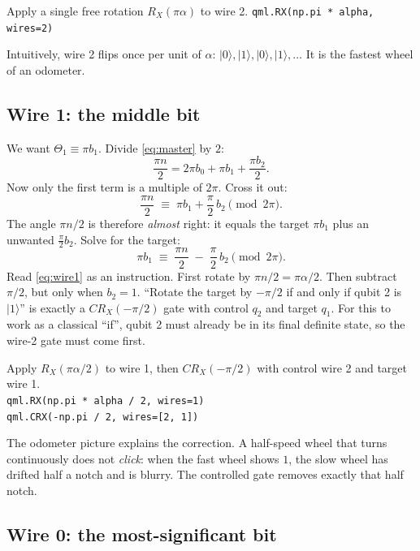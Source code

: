 \documentclass[11pt,a4paper]{article}
\newcommand{\ket}[1]{\lvert #1 \rangle}
\newcommand{\RX}{R_X}
\newcommand{\CRX}{CR_X}
\newcommand{\code}[1]{\texttt{#1}}
\newcommand{\eqmod}[1]{\;\equiv\;#1\pmod{2\pi}}
\theoremstyle{plain}
\theoremstyle{definition}
\theoremstyle{remark}
\begin{document}
\begin{resultbox}
Apply a single free rotation $\RX(\pi\alpha)$ to wire 2. \hfill \code{qml.RX(np.pi * alpha, wires=2)}
\end{resultbox}

\noindent Intuitively, wire 2 flips once per unit of $\alpha$: $\ket{0},\ket{1},\ket{0},\ket{1},\dots$
It is the fastest wheel of an odometer.

\subsection{Wire 1: the middle bit}

We want $\Theta_1 \equiv \pi b_1$. Divide \eqref{eq:master} by $2$:
\[
\frac{\pi n}{2} = 2\pi b_0 + \pi b_1 + \frac{\pi b_2}{2}.
\]
Now only the first term is a multiple of $2\pi$. Cross it out:
\[
\frac{\pi n}{2} \eqmod{\pi b_1 + \frac{\pi}{2}\,b_2}.
\]
The angle $\pi n/2$ is therefore \emph{almost} right: it equals the target $\pi b_1$ plus an
unwanted $\frac{\pi}{2}b_2$. Solve for the target:
\begin{equation}\label{eq:wire1}
\pi b_1 \eqmod{\frac{\pi n}{2} \;-\; \frac{\pi}{2}\,b_2}.
\end{equation}
Read \eqref{eq:wire1} as an instruction. First rotate by $\pi n/2 = \pi\alpha/2$. Then subtract
$\pi/2$, but only when $b_2 = 1$. ``Rotate the target by $-\pi/2$ if and only if qubit 2 is
$\ket{1}$'' is exactly a $\CRX(-\pi/2)$ gate with control $q_2$ and target $q_1$. For this to work
as a classical ``if'', qubit 2 must already be in its final definite state, so the wire-2 gate
must come first.

\begin{resultbox}
Apply $\RX(\pi\alpha/2)$ to wire 1, then $\CRX(-\pi/2)$ with control wire 2 and target wire 1.\\[3pt]
\code{qml.RX(np.pi * alpha / 2, wires=1)}\\
\code{qml.CRX(-np.pi / 2, wires=[2, 1])}
\end{resultbox}

\noindent The odometer picture explains the correction. A half-speed wheel that turns
continuously does not \emph{click}: when the fast wheel shows $1$, the slow wheel has drifted half
a notch and is blurry. The controlled gate removes exactly that half notch.

\subsection{Wire 0: the most-significant bit}
\end{document}
